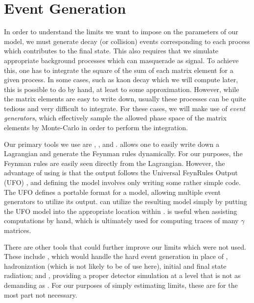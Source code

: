 \section{Event Generation}

In order to understand the limits we want to impose on the parameters of our model, we must generate decay (or collision) events corresponding to each process which contributes to the final state.
This also requires that we simulate appropriate background processes which can masquerade as signal.
To achieve this, one has to integrate the square of the sum of each matrix element for a given process.
In some cases, such as kaon decay which we will compute later, this is possible to do by hand, at least to some approximation.
However, while the matrix elements are easy to write down, usually these processes can be quite tedious and very difficult to integrate.
For these cases, we will make use of \emph{event generators}, which effectively sample the allowed phase space of the matrix elements by Monte-Carlo in order to perform the integration.

Our primary tools we use are \feynrules \cite{Alloul:2013bka}, \feyncalc \cite{Mertig:1990an}, and \mgamcnlo \cite{Alwall:2011uj,Alwall:2014hca}.
\feynrules allows one to easily write down a Lagrangian and generate the Feynman rules dynamically.
For our purposes, the Feynman rules are easily seen directly from the Lagrangian.
However, the advantage of using \feynrules is that the output follows the Universal FeynRules Output (UFO) \cite{Degrande:2011ua}, and defining the model involves only writing some rather simple \mathematica code.
The UFO defines a portable format for a model, allowing multiple event generators to utilize its output.
\madgraph can utilize the resulting model simply by putting the UFO model into the appropriate location within \madgraph.
\feyncalc is useful when assisting computations by hand, which is ultimately used for computing traces of many $\gamma$ matrices.

There are other tools that could further improve our limits which were not used.
These include \pythia \cite{Sjostrand:2007gs}, which would handle the hard event generation in place of \madgraph, hadronization (which is not likely to be of use here), initial and final state radiation; and \delphes \cite{Selvaggi:2014mya}, providing a proper detector simulation at a level that is not as demanding as \geant \cite{Agostinelli:2002hh}. For our purposes of simply estimating limits, these are for the most part not necessary.

